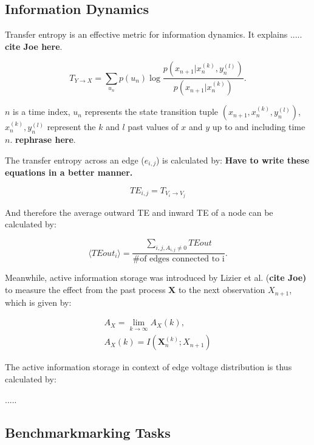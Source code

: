 \documentclass[fleqn,10pt,  reprint, amsmath,amssymb,aps, floatfix]{wlscirep}
\begin{document}
\subsection*{Information Dynamics}

Transfer entropy is an effective metric for information dynamics. It explains ..... \textbf{cite Joe here}.

\begin{equation}
T_{Y \rightarrow X} = \sum \limits_{u_n} p(u_n) \log \frac{p(x_{n+1}| x_n^{(k)}, y_n^{(l)})}{p(x_{n+1}|x_n^{(k)})}.
\end{equation}

$n$ is a time index, $u_n$ represents the state transition tuple $(x_{n+1}, x_n^{(k)}, y_n^{(l)})$, $x_n^{(k)}, y_n^{(l)}$ represent the $k$ and $l$ past values of $x$ and $y$ up to and including time $n$. \textbf{rephrase here}.


The transfer entropy across an edge ($e_{i,j}$) is calculated by:
\textbf{Have to write these equations in a better manner.}

\begin{equation}
TE_{i,j} = T_{V_i \rightarrow V_j}
\end{equation}

And therefore the average outward TE and inward TE of a node can be calculated by:

\begin{equation}
\langle TEout_i \rangle = \frac{\sum \limits_{i,j, A_{i,j} \neq 0} TEout}{\text{\# of edges connected to i}}.
\end{equation}


Meanwhile, active information storage was introduced by Lizier et al. (\textbf{cite Joe)} to measure the effect from the past process $\mathbf X$ to the next observation $X_{n+1}$, which is given by:

\begin{align}
	A_X = \lim \limits_{k \rightarrow \infty} A_X (k),\\
	A_X(k) = I(\mathbf X_n^{(k)}; X_{n+1})
	\label{eq:AIS}
\end{align}

The active information storage in context of edge voltage distribution is thus calculated by:

.....

\subsection*{Benchmarkmarking Tasks}
\end{document}
